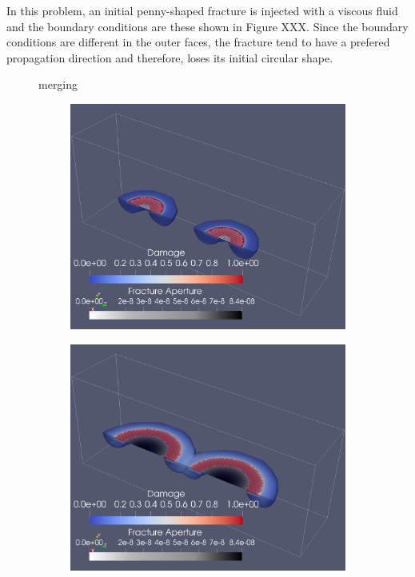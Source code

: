 In this problem, an initial penny-shaped fracture is injected with a viscous fluid and the boundary conditions are these shown in Figure XXX. Since the boundary conditions are different in the outer faces, the fracture tend to have a prefered propagation direction and therefore, loses its initial circular shape. 

\begin{figure}[h]
\noindent
\hspace{0.5cm}

\caption{merging}
\label{fig:merging_charts}
\end{figure}


\begin{figure}[h]
\begin{subfigure}{.45\textwidth}
  \centering
  \includegraphics[width=\linewidth]{Chapter4/figures/merging/merge_t_1(1).png}
  \caption{}
  \label{fig:merge_t_0}
\end{subfigure}%
\hspace{1cm}
\begin{subfigure}{.45\textwidth}
  \centering
  \includegraphics[width=\linewidth]{Chapter4/figures/merging/merge_t_17(1).png}

\end{subfigure}
\end{figure}
